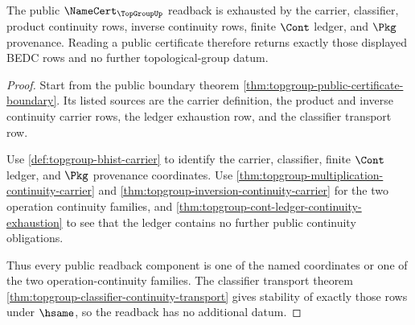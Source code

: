 \begin{theorem}
\label{thm:topgroup-public-namecert-readback-exactness}
The public $\NameCert_{\TopGroupUp}$ readback is exhausted by the carrier,
classifier, product continuity rows, inverse continuity rows, finite $\Cont$
ledger, and $\Pkg$ provenance. Reading a public certificate therefore returns
exactly those displayed BEDC rows and no further topological-group datum.
\end{theorem}
\begin{proof}
Start from the public boundary theorem
\autoref{thm:topgroup-public-certificate-boundary}. Its listed sources are
the carrier definition, the product and inverse continuity carrier rows, the
ledger exhaustion row, and the classifier transport row.

Use \autoref{def:topgroup-bhist-carrier} to identify the carrier,
classifier, finite $\Cont$ ledger, and $\Pkg$ provenance coordinates. Use
\autoref{thm:topgroup-multiplication-continuity-carrier} and
\autoref{thm:topgroup-inversion-continuity-carrier} for the two operation
continuity families, and
\autoref{thm:topgroup-cont-ledger-continuity-exhaustion} to see that the
ledger contains no further public continuity obligations.

Thus every public readback component is one of the named coordinates or one
of the two operation-continuity families. The classifier transport theorem
\autoref{thm:topgroup-classifier-continuity-transport} gives stability of
exactly those rows under $\hsame$, so the readback has no additional datum.
\end{proof}

